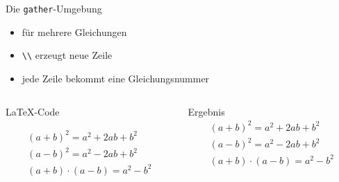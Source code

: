 \begin{frame}[fragile]{Die \texttt{gather}-Umgebung}
    \begin{itemize}
        \item für mehrere Gleichungen
        \item \texttt{\textbackslash\textbackslash} erzeugt neue Zeile
        \item jede Zeile bekommt eine Gleichungsnummer
    \end{itemize}
  \begin{columns}[T]
    \begin{column}{0.53\textwidth}
      \begin{block}{\LaTeX-Code}
        \begin{lstverbatim}
        \begin{gather}
            (a + b)^2 = a^2 + 2ab + b^2 \\
            (a - b)^2 = a^2 - 2ab + b^2 \\
            (a + b) \cdot (a-b) = a^2 -  b^2
        \end{gather}
        \end{lstverbatim}
      \end{block}
    \end{column}
    \begin{column}{0.43\textwidth}
      \begin{block}{Ergebnis}
        \begin{gather}
            (a + b)^2 = a^2 + 2ab + b^2 \\
            (a - b)^2 = a^2 - 2ab + b^2 \\
            (a + b) \cdot (a-b) = a^2 -  b^2 
        \end{gather}
      \end{block}
    \end{column}
  \end{columns}
\end{frame}


